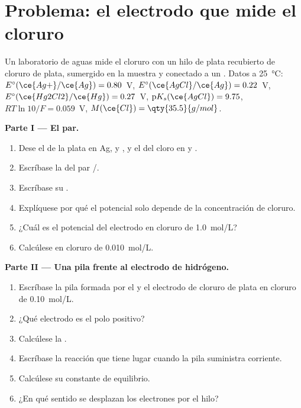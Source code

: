 \section{Problema: el electrodo que mide el cloruro}

\begin{problem}
\label{pb:b1:nernst:1}
Un laboratorio de aguas mide el cloruro con un hilo de plata recubierto de
cloruro de plata, sumergido en la muestra y conectado a un . Datos a \qty{25}{\celsius}: $E^\circ(\ce{Ag+}/\ce{Ag}) = 0.80$~V,
$E^\circ(\ce{AgCl}/\ce{Ag}) = 0.22$~V, $E^\circ(\ce{Hg2Cl2}/\ce{Hg}) =
0.27$~V, $\mathrm{p}K_s(\ce{AgCl}) = 9.75$, $RT\ln 10/F = 0.059$~V,
$M(\ce{Cl}) = \qty{35.5}{g/mol}$.

\medskip
\noindent\textbf{Parte I --- El par.}
\begin{enumerate}
  \item Dese el  de la plata en Ag,  y
        , y el del cloro en  y .
  \item Escríbase la  del par /.
  \item Escríbase su .
  \item Explíquese por qué el potencial solo depende de la concentración
        de cloruro.
  \item ¿Cuál es el potencial del electrodo en cloruro de
        \qty{1.0}{mol/L}?
  \item Calcúlese en cloruro de \qty{0.010}{mol/L}.
\end{enumerate}

\medskip
\noindent\textbf{Parte II --- Una pila frente al electrodo de hidrógeno.}
\begin{enumerate}[resume]
  \item Escríbase la pila formada por el  y
        el electrodo de cloruro de plata en cloruro de \qty{0.10}{mol/L}.
  \item ¿Qué electrodo es el polo positivo?
  \item Calcúlese la .
  \item Escríbase la reacción que tiene lugar cuando la pila suministra
        corriente.
  \item Calcúlese su constante de equilibrio.
  \item ¿En qué sentido se desplazan los electrones por el hilo?
\end{enumerate}


\end{problem}
